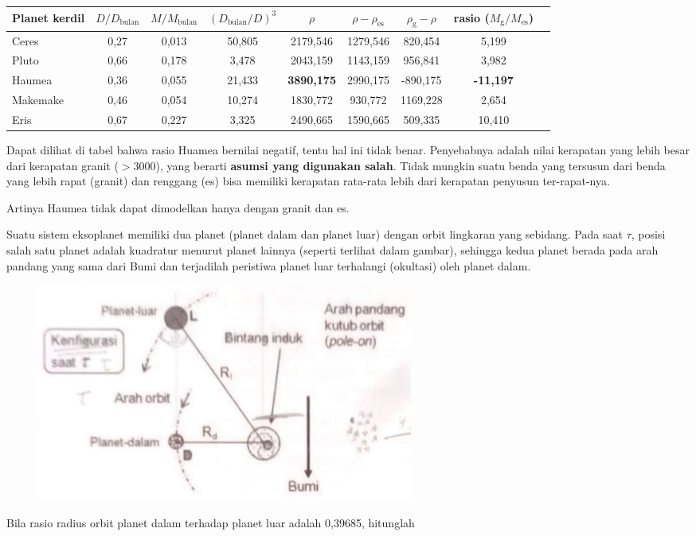 \documentclass[11pt,fleqn]{exam}
\begin{document}
\begin{questions}
\begin{table}[h!]
\centering
\begin{tabular}{|l|c|c|c|c|c|c|c|c|}
\hline
Planet kerdil & $D/D_{\text{bulan}}$ & $M/M_{\text{bulan}}$ & $(D_{\text{bulan}}/D)^3$ & $\rho$ & $\rho - \rho_{\text{es}}$ & $\rho_{\text{g}} - \rho$ & rasio ($M_{\text{g}} / M_{\text{es}}$)\\
\hline
\hline
Ceres & 0,27 & 0,013 & 50,805 & 2179,546 & 1279,546 & 820,454 & 5,199 \\
\hline
Pluto & 0,66 & 0,178 & 3,478 & 2043,159 & 1143,159 & 956,841 & 3,982 \\
\hline
Haumea & 0,36 & 0,055 & 21,433 & \textbf{3890,175} & 2990,175 & -890,175 & \textbf{-11,197} \\
\hline
Makemake & 0,46 & 0,054 & 10,274 & 1830,772 & 930,772 & 1169,228 & 2,654 \\
\hline
Eris & 0,67 & 0,227 & 3,325 & 2490,665 & 1590,665 & 509,335 & 10,410 \\
\hline
\end{tabular}
\end{table}

Dapat dilihat di tabel bahwa rasio Huamea bernilai negatif, tentu hal ini tidak benar. Penyebabnya adalah nilai kerapatan yang lebih besar dari kerapatan granit ($> 3000$), yang berarti \textbf{asumsi yang digunakan salah}. Tidak mungkin suatu benda yang tersusun dari benda yang lebih rapat (granit) dan renggang (es) bisa memiliki kerapatan rata-rata lebih dari kerapatan penyusun ter-rapat-nya. 

Artinya Haumea tidak dapat dimodelkan hanya dengan granit dan es.

\vspace{0.3cm}
\question Suatu sistem eksoplanet memiliki dua planet (planet dalam dan planet luar) dengan orbit lingkaran yang sebidang. Pada saat $\tau$, posisi salah satu planet adalah kuadratur menurut planet lainnya (seperti terlihat dalam gambar), sehingga kedua planet berada pada arah pandang yang sama dari Bumi dan terjadilah peristiwa planet luar terhalangi (okultasi) oleh planet dalam.
\begin{figure}[ht!]
\centering
\includegraphics[width=0.6\textwidth]{no23.png}
\end{figure}
Bila rasio radius orbit planet dalam terhadap planet luar adalah 0,39685, hitunglah


\end{questions}
\end{document}
